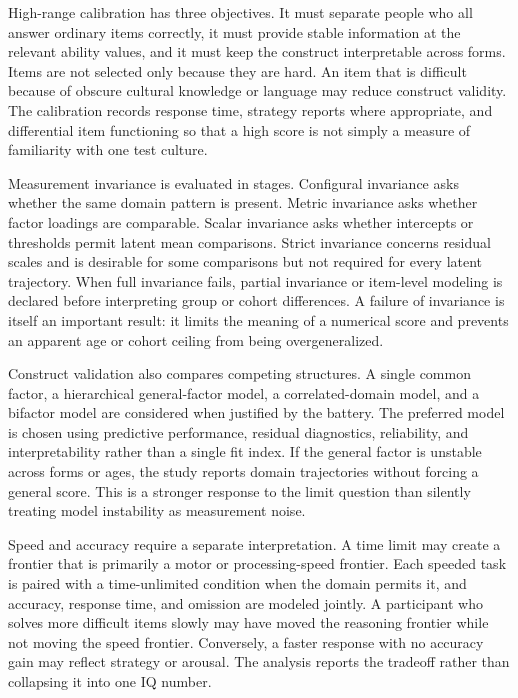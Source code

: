 \documentclass[conference]{IEEEtran}
\begin{document}
High-range calibration has three objectives. It must separate people who all answer ordinary items correctly, it must provide stable information at the relevant ability values, and it must keep the construct interpretable across forms. Items are not selected only because they are hard. An item that is difficult because of obscure cultural knowledge or language may reduce construct validity. The calibration records response time, strategy reports where appropriate, and differential item functioning so that a high score is not simply a measure of familiarity with one test culture.

Measurement invariance is evaluated in stages. Configural invariance asks whether the same domain pattern is present. Metric invariance asks whether factor loadings are comparable. Scalar invariance asks whether intercepts or thresholds permit latent mean comparisons. Strict invariance concerns residual scales and is desirable for some comparisons but not required for every latent trajectory. When full invariance fails, partial invariance or item-level modeling is declared before interpreting group or cohort differences. A failure of invariance is itself an important result: it limits the meaning of a numerical score and prevents an apparent age or cohort ceiling from being overgeneralized.

Construct validation also compares competing structures. A single common factor, a hierarchical general-factor model, a correlated-domain model, and a bifactor model are considered when justified by the battery. The preferred model is chosen using predictive performance, residual diagnostics, reliability, and interpretability rather than a single fit index. If the general factor is unstable across forms or ages, the study reports domain trajectories without forcing a general score. This is a stronger response to the limit question than silently treating model instability as measurement noise.

Speed and accuracy require a separate interpretation. A time limit may create a frontier that is primarily a motor or processing-speed frontier. Each speeded task is paired with a time-unlimited condition when the domain permits it, and accuracy, response time, and omission are modeled jointly. A participant who solves more difficult items slowly may have moved the reasoning frontier while not moving the speed frontier. Conversely, a faster response with no accuracy gain may reflect strategy or arousal. The analysis reports the tradeoff rather than collapsing it into one IQ number.
\end{document}
